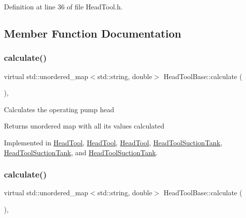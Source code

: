 Definition at line 36 of file Head\+Tool.\+h.



\subsection{Member Function Documentation}
\mbox{\label{class_head_tool_base_ab8df8f908827ce45dc5e769ea0e10f0b}} 
\subsubsection{\texorpdfstring{calculate()}{calculate()}\hspace{0.1cm}{\footnotesize\ttfamily [1/3]}}
{\footnotesize\ttfamily virtual std\+::unordered\+\_\+map$<$std\+::string, double$>$ Head\+Tool\+Base\+::calculate (\begin{DoxyParamCaption}{ }\end{DoxyParamCaption})\hspace{0.3cm}{\ttfamily [protected]}, {}}

Calculates the operating pump head

\begin{DoxyReturn}{Returns}
unordered map with all its values calculated 
\end{DoxyReturn}


Implemented in \hyperlink{class_head_tool_ab107e7717df4ca95404ce1952c21a84e}{Head\+Tool}, \hyperlink{class_head_tool_a146eaf45d39cf6d691fa10b4b80b5e9e}{Head\+Tool}, \hyperlink{class_head_tool_a146eaf45d39cf6d691fa10b4b80b5e9e}{Head\+Tool}, \hyperlink{class_head_tool_suction_tank_a390a38466222aa3b87d2cf2ec84537a5}{Head\+Tool\+Suction\+Tank}, \hyperlink{class_head_tool_suction_tank_a7e4a6931caa7c9be43992aecdfb80bec}{Head\+Tool\+Suction\+Tank}, and \hyperlink{class_head_tool_suction_tank_a7e4a6931caa7c9be43992aecdfb80bec}{Head\+Tool\+Suction\+Tank}.

\mbox{\label{class_head_tool_base_ab8df8f908827ce45dc5e769ea0e10f0b}} 
\subsubsection{\texorpdfstring{calculate()}{calculate()}\hspace{0.1cm}{\footnotesize\ttfamily [2/3]}}
{\footnotesize\ttfamily virtual std\+::unordered\+\_\+map$<$std\+::string, double$>$ Head\+Tool\+Base\+::calculate (\begin{DoxyParamCaption}{ }\end{DoxyParamCaption})\hspace{0.3cm}{\ttfamily [protected]}, {}}


